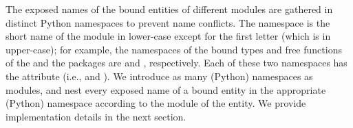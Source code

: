 \begin{table}[!htp]
  \caption{Module names and short names}
  \centering{}
  \label{tab:moduleName}
\end{table}

The exposed names of the bound entities of different modules are
gathered in distinct Python namespaces to prevent name conflicts. The
namespace is the short name of the module in lower-case except for the
first letter (which is in upper-case); for example, the namespaces of
the bound types and free functions of the
\iiDandiiiDGeometryKernelPackage{} and the
\iiDRegularizedBooleanSetOperationsPackage{} packages are
 and , respectively.  Each of these
two namespaces has the attribute  (i.e.,
 and
). We introduce as many (Python)
namespaces as modules, and nest every exposed name of a bound entity
in the appropriate (Python) namespace according to the module of the
entity. We provide implementation details in the next section.

